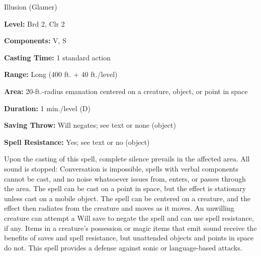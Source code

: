 
Illusion (Glamer)

\textbf{Level:} Brd 2, Clr 2

\textbf{Components:} V, S

\textbf{Casting Time:} 1 standard action

\textbf{Range:} Long (400 ft. + 40 ft./level)

\textbf{Area:} 20-ft.-radius emanation centered on a creature, object, or point 
in space

\textbf{Duration:} 1 min./level (D)

\textbf{Saving Throw:} Will negates; see text or none (object)

\textbf{Spell Resistance:} Yes; see text or no (object)

Upon the casting of this spell, complete silence prevails in the affected area. 
All sound is stopped: Conversation is impossible, spells with verbal components 
cannot be cast, and no noise whatsoever issues from, enters, or passes through 
the area. The spell can be cast on a point in space, but the effect is stationary 
unless cast on a mobile object. The spell can be centered on a creature, and the 
effect then radiates from the creature and moves as it moves. An unwilling creature 
can attempt a Will save to negate the spell and can use spell resistance, if any. 
Items in a creature's possession or magic items that emit sound receive the benefits 
of saves and spell resistance, but unattended objects and points in space do not. 
This spell provides a defense against sonic or language-based attacks.

